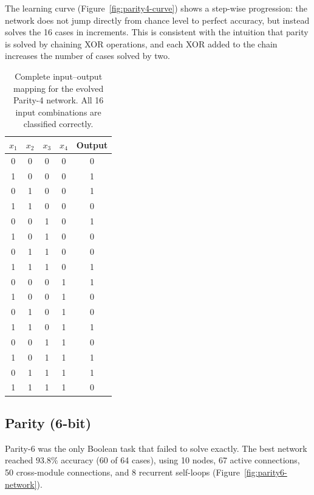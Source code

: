 The learning curve (Figure~\ref{fig:parity4-curve}) shows a
step-wise progression: the network does not jump directly from chance
level to perfect accuracy, but instead solves the 16 cases in
increments. This is consistent with the intuition that parity is
solved by chaining XOR operations, and each XOR added to the chain
increases the number of cases solved by two.

\begin{table}[h]
  \centering
  \small
  \caption{Complete input--output mapping for the evolved
    Parity-4 network. All 16 input combinations are classified
    correctly.}
  \label{tab:parity4-samples}
  \begin{tabular}{cccc|c}
    \toprule
    $x_1$ & $x_2$ & $x_3$ & $x_4$ & \textbf{Output} \\
    \midrule
    0 & 0 & 0 & 0 & 0 \\
    1 & 0 & 0 & 0 & 1 \\
    0 & 1 & 0 & 0 & 1 \\
    1 & 1 & 0 & 0 & 0 \\
    0 & 0 & 1 & 0 & 1 \\
    1 & 0 & 1 & 0 & 0 \\
    0 & 1 & 1 & 0 & 0 \\
    1 & 1 & 1 & 0 & 1 \\
    0 & 0 & 0 & 1 & 1 \\
    1 & 0 & 0 & 1 & 0 \\
    0 & 1 & 0 & 1 & 0 \\
    1 & 1 & 0 & 1 & 1 \\
    0 & 0 & 1 & 1 & 0 \\
    1 & 0 & 1 & 1 & 1 \\
    0 & 1 & 1 & 1 & 1 \\
    1 & 1 & 1 & 1 & 0 \\
    \bottomrule
  \end{tabular}
\end{table}

\subsection{Parity (6-bit)}
\label{sec:results-parity6}

Parity-6 was the only Boolean task that \modnet{} failed to solve
exactly. The best network reached $93.8\%$ accuracy (60 of 64 cases),
using 10 nodes, 67 active connections, 50 cross-module connections,
and 8 recurrent self-loops (Figure~\ref{fig:parity6-network}).

